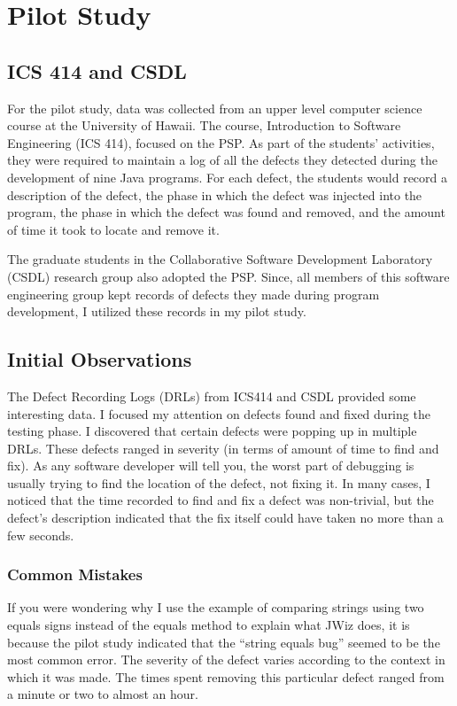 \section{Pilot Study}
\subsection{ICS 414 and CSDL}
For the pilot study, data was collected from an upper level computer
science course at the University of Hawaii.  The course, Introduction to
Software Engineering (ICS 414), focused on the PSP.  As part of the
students' activities, they were required to maintain a log of all the
defects they detected during the development of nine Java programs. For
each defect, the students would record a description of the defect, the
phase in which the defect was injected into the program, the phase in which
the defect was found and removed, and the amount of time it took to locate
and remove it.

The graduate students in the Collaborative Software Development Laboratory
(CSDL) research group also adopted the PSP.  Since, all members of this
software engineering group kept records of defects they made during program
development, I utilized these records in my pilot study.

\subsection{Initial Observations}
The Defect Recording Logs (DRLs) from ICS414 and CSDL provided some
interesting data.  I focused my attention on defects found and fixed during
the testing phase.  I discovered that certain defects were popping up in
multiple DRLs.  These defects ranged in severity (in terms of amount of
time to find and fix).  As any software developer will tell you, the worst
part of debugging is usually trying to find the location of the defect, not
fixing it.  In many cases, I noticed that the time recorded to find and fix
a defect was non-trivial, but the defect's description indicated that the
fix itself could have taken no more than a few seconds.

\subsubsection{Common Mistakes}
If you were wondering why I use the example of comparing strings using two
equals signs instead of the equals method to explain what JWiz does, it is
because the pilot study indicated that the ``string equals bug'' seemed to
be the most common error.  The severity of the defect varies according to
the context in which it was made. The times spent removing this particular
defect ranged from a minute or two to almost an hour.

